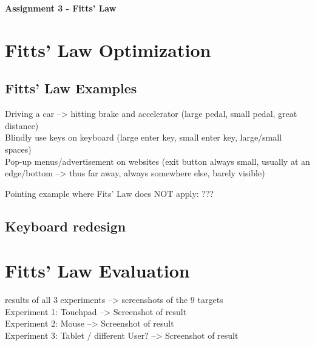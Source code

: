 \documentclass[a4paper,twoside,10pt]{article}
\begin{document}
\pagestyle{fancyplain}


\renewcommand{\headrulewidth}{0px}

\begin{center}
\huge{\textbf{Assignment 3 - Fitts' Law}}
\end{center}
\vspace{.5cm}

\section{Fitts' Law Optimization} 
\subsection{Fitts' Law Examples} 
Driving a car --> hitting brake and accelerator (large pedal, small pedal, great distance)\\
Blindly use keys on keyboard (large enter key, small enter key, large/small spaces)\\
Pop-up menus/advertisement on websites (exit button always small, usually at an edge/bottom --> thus far away, always somewhere else, barely visible)

Pointing example where Fits' Law does NOT apply: ???
\subsection{Keyboard redesign} 

\section{Fitts' Law Evaluation}
results of all 3 experiments --> screenshots of the 9 targets\\
Experiment 1: Touchpad --> Screenshot of result\\
Experiment 2: Mouse --> Screenshot of result\\
Experiment 3: Tablet / different User? --> Screenshot of result
\end{document}
